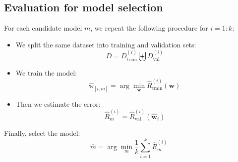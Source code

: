 \documentclass[a4paper,10pt,twoside]{article}
\begin{document}
\subsection{Evaluation for model selection}
For each candidate model $m$, we repeat the following procedure for $i=1:k$:
\begin{itemize}
    \item We split the same dataset into training and validation sets:
    \begin{equation*}
        D=D_{\text{train}}^{(i)}\biguplus D_{\text{val}}^{(i)}
    \end{equation*}
    \item We train the model:
    \begin{equation*}
        \hat{\mathbb{w}}_[i,m]=\arg\min_{\mathbf{w}}\hat{R}_{\text{train}}^{(i)}(\mathbf{w})
    \end{equation*}
    \item Then we estimate the error:
    \begin{equation*}
        \hat{R}_{m}^{(i)}=\hat{R}_{\text{val}}^{(i)}(\hat{\mathbf{w}}_i)
    \end{equation*}
\end{itemize}
Finally, select the model:
\begin{equation*}
    \hat{m}=\arg\min_{m}\frac{1}{k}\sum_{i=1}^{k}\hat{R}_{m}^{(i)}
\end{equation*}
\end{document}
